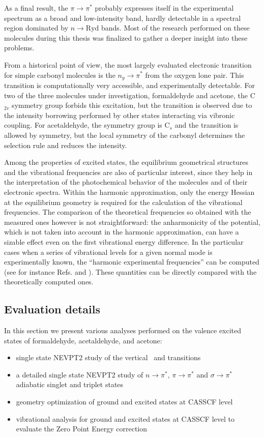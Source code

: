 As a final result, the $\pi \rightarrow \pi^{*}$ probably expresses itself in
the experimental spectrum as a broad and low-intensity band, hardly
detectable in a spectral region dominated by $n \rightarrow \mbox{Ryd}$
bands. Most of the research performed on these molecules during this thesis
was finalized to gather a deeper insight into these problems.

From a historical point of view, the most largely evaluated electronic transition
for simple carbonyl molecules is the $n_y \rightarrow \pi^{*}$ from the
oxygen lone pair. This transition is computationally very accessible, and
experimentally detectable.  For two of the three molecules under
investigation, formaldehyde and acetone, the C$_{2v}$ symmetry group forbids
this excitation, but the transition is observed due to the intensity
borrowing performed by other states interacting via vibronic coupling. For
acetaldehyde, the symmetry group is C$_s$ and the transition is
allowed by symmetry, but the local symmetry of the carbonyl determines the
selection rule and reduces the intensity\cite{jcp-87-3796-1987}.

Among the properties of excited states, the equilibrium geometrical
structures and the vibrational frequencies are also of particular interest,
since they help in the interpretation of the photochemical behavior of the
molecules and of their electronic spectra.  Within the harmonic
approximation, only the energy Hessian at the equilibrium geometry is
required for the calculation of the vibrational frequencies.  The comparison
of the theoretical frequencies so obtained with the measured ones however is
not straightforward: the anharmonicity of the potential, which is not taken
into account in the harmonic approximation, can have a sizable effect even
on the first vibrational energy difference. In the particular cases when a
series of vibrational levels for a given normal mode is experimentally
known, the ``harmonic experimental frequencies'' can be computed (see for
instance Refs.  and ).
These quantities can be directly compared with the theoretically computed
ones.

\subsection*{Evaluation details}

In this section we present various analyses performed on the valence excited
states of formaldehyde, acetaldehyde, and acetone:
\begin{itemize}
\item single state NEVPT2 study of the vertical \snpi\  and \tnpi
transitions
\item a detailed single state NEVPT2 study of $n \rightarrow \pi^{*}$, $\pi
\rightarrow \pi^{*}$  and $\sigma \rightarrow \pi^{*}$ adiabatic singlet and triplet
states
\item geometry optimization of ground and excited states at CASSCF level
\item vibrational analysis for ground and excited states at CASSCF level to
evaluate the Zero Point Energy correction
\end{itemize}


